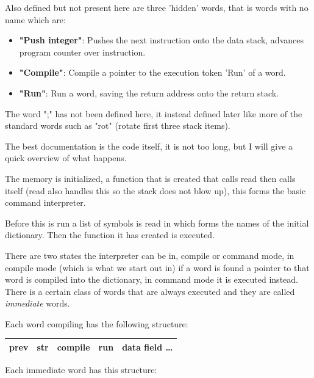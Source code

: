 \documentclass	[a4paper, 10pt]	{article}
\begin{document}
      Also defined but not present here are three 'hidden' words, that is
      words with no name which are:

      \begin{itemize}
        \item \textbf{"Push integer"}: Pushes the next instruction onto the
        data stack, advances program counter over instruction.
        \item \textbf{"Compile"}: Compile a pointer to the execution token
        'Run' of a word.
        \item \textbf{"Run"}: Run a word, saving the return address onto the
        return stack.
      \end{itemize}

      The word ";" has not been defined here, it instead defined later like
      more of the standard words such as "rot" (rotate first three stack
      items). 

      The best documentation is the code itself, it is not too long, but
      I will give a quick overview of what happens.

      The memory is initialized, a function that is created that calls
      read then calls itself (read also handles this so the stack does
      not blow up), this forms the basic command interpreter.

      Before this is run a list of symbols is read in which forms the
      names of the initial dictionary. Then the function it has created
      is executed.

      There are two states the interpreter can be in, compile or command
      mode, in compile mode (which is what we start out in) if a word is
      found a pointer to that word is compiled into the dictionary, in
      command mode it is executed instead. There is a certain class of
      words that are always executed and they are called \emph{immediate}
      words.

      Each word compiling has the following structure:

      \begin{center}
        \begin{tabular}{l | c | c | c | r }
          \hline
          prev & str & \textbf{compile} & run & data field \ldots \\
          \hline
        \end{tabular}
      \end{center}

      Each immediate word has this structure:
      
\end{document}

